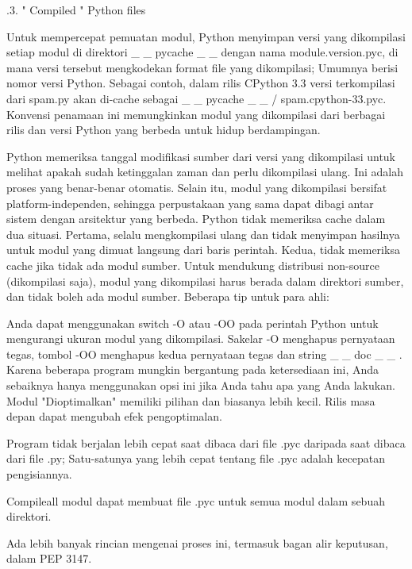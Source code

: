 .3.   " Compiled  "  Python files \par
\noindent 
Untuk mempercepat pemuatan modul, Python menyimpan versi yang dikompilasi setiap modul di direktori    \_     \_  pycache   \_     \_   dengan nama module.version.pyc, di mana versi tersebut mengkodekan format file yang dikompilasi; Umumnya berisi nomor versi Python. Sebagai contoh, dalam rilis CPython 3.3 versi terkompilasi dari spam.py akan di-cache sebagai    \_     \_  pycache    \_     \_   / spam.cpython-33.pyc. Konvensi penamaan ini memungkinkan modul yang dikompilasi dari berbagai rilis dan versi Python yang berbeda untuk hidup berdampingan.  \par
\vspace{12pt}
\noindent 
Python memeriksa tanggal modifikasi sumber dari versi yang dikompilasi untuk melihat apakah sudah ketinggalan zaman dan perlu dikompilasi ulang. Ini adalah proses yang benar-benar otomatis. Selain itu, modul yang dikompilasi bersifat platform-independen, sehingga perpustakaan yang sama dapat dibagi antar sistem dengan arsitektur yang berbeda. Python tidak memeriksa cache dalam dua situasi. Pertama, selalu mengkompilasi ulang dan tidak menyimpan hasilnya untuk modul yang dimuat langsung dari baris perintah. Kedua, tidak memeriksa cache jika tidak ada modul sumber. Untuk mendukung distribusi non-source (dikompilasi saja), modul yang dikompilasi harus berada dalam direktori sumber, dan tidak boleh ada modul sumber. 
Beberapa tip untuk para ahli: \par
\noindent 
  \bullet  Anda dapat menggunakan switch -O atau -OO pada perintah Python untuk mengurangi ukuran modul yang dikompilasi. Sakelar -O menghapus pernyataan tegas, tombol -OO menghapus kedua pernyataan tegas dan string    \_     \_  doc   \_     \_  . Karena beberapa program mungkin bergantung pada ketersediaan ini, Anda sebaiknya hanya menggunakan opsi ini jika Anda tahu apa yang Anda lakukan. Modul "Dioptimalkan" memiliki pilihan dan biasanya lebih kecil. Rilis masa depan dapat mengubah efek pengoptimalan. \par
  \bullet  Program tidak berjalan lebih cepat saat dibaca dari file .pyc daripada saat dibaca dari file .py; Satu-satunya yang lebih cepat tentang file .pyc adalah kecepatan pengisiannya. \par
\noindent 
  \bullet  Compileall modul dapat membuat file .pyc untuk semua modul dalam sebuah direktori. \par
\noindent 
  \bullet  Ada lebih banyak rincian mengenai proses ini, termasuk bagan alir keputusan, dalam PEP 3147. \par

